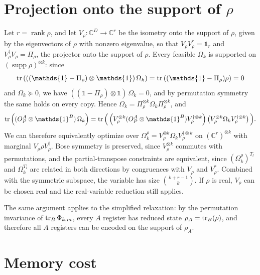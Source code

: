 \documentclass[11pt,a4paper]{report}
\newcommand{\one}{\mathds{1}}
\newcommand{\I}{\one}
\newcommand{\C}{\mathds{C}}
\newcounter{reptag}
\newif\iftags \tagsfalse   %
\newcommand{\reptagbox}[3]{\iftags\par\smallskip\noindent\refstepcounter{reptag}%
  \fcolorbox{#1}{#1!7}{\parbox{\dimexpr\linewidth-2\fboxsep-2\fboxrule\relax}{\small
  \textcolor{#1}{\textbf{[\thereptag]\ #2.}}\ #3}}\par\smallskip\fi}
\newcommand{\detail}[1]{\reptagbox{tagD}{More detail}{#1}}
\begin{document}
\section{Projection onto the support of $\rho$}\label{app:supportReduction}
Let $r = \operatorname{rank} \rho$, and let $V_\rho: \C^D \to \C^r$ be the isometry onto the support of $\rho$, given by the eigenvectors of $\rho$ with nonzero eigenvalue, so that $V_\rho V_\rho^\dagger=\I_r$ and $V_\rho^\dagger V_\rho=\Pi_\rho$, the projector onto the support of $\rho$. Every feasible $\Omega_k$ is supported on $(\operatorname{supp}\rho)^{\otimes k}$: since
\begin{equation}
    \tr\left(((\I-\Pi_\rho)\otimes\I)\,\Omega_k\right)=\tr\left((\I-\Pi_\rho)\rho\right)=0
\end{equation}
and $\Omega_k\succeq0$, we have $((\I-\Pi_\rho)\otimes\I)\,\Omega_k=0$, and by permutation symmetry the same holds on every copy. Hence $\Omega_k=\Pi_\rho^{\otimes k}\Omega_k\Pi_\rho^{\otimes k}$, and
\begin{equation}
    \tr\left((O_P^A\otimes\I^B)\,\Omega_k\right)=\tr\Big(\left(V_\rho^{\otimes k}(O_P^A\otimes\I^B)V_\rho^{\dagger\otimes k}\right)\left(V_\rho^{\otimes k}\Omega_kV_\rho^{\dagger\otimes k}\right)\Big).
\end{equation}
We can therefore equivalently optimize over $\Omega_k^\rho=V_\rho^{\otimes k}\Omega_kV_\rho^{\dagger\otimes k}$ on $(\C^r)^{\otimes k}$ with marginal $V_\rho\rho V_\rho^\dagger$. Bose symmetry is preserved, since $V_\rho^{\otimes k}$ commutes with permutations, and the partial-transpose constraints are equivalent, since $(\Omega_k^\rho)^{T_l}$ and $\Omega_k^{T_l}$ are related in both directions by congruences with $V_\rho$ and $V_\rho^*$. Combined with the symmetric subspace, the variable has size $\binom{k+r-1}{k}$. If $\rho$ is real, $V_\rho$ can be chosen real and the real-variable reduction still applies.

The same argument applies to the simplified relaxation: by the permutation invariance of $\tr_B\Phi_{k,m}$, every $A$ register has reduced state $\rho_A=\tr_B(\rho)$, and therefore all $A$ registers can be encoded on the support of $\rho_A$.

\section{Memory cost}\label{sec:memory}

\detail{Give the full memory model and its validation here: $n$ as a function of $r$, $r_A$ and the level, the $8n^2$ estimate against the 33 measured cases, the derivation of the rule $r<(k+1)\,r_A-k$, and a table comparing the two hierarchies at equal memory. The story of the memory measurement that wrongly included the Python model assembly (3.2\,GB against 0.1\,GB in the solver) belongs in Appendix~\ref{app:numerics}.}
\end{document}
